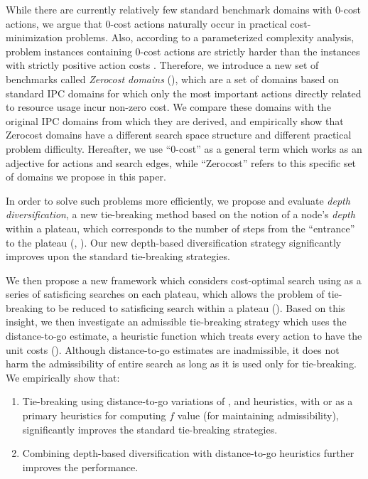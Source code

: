 While there are currently relatively few standard benchmark domains with 0-cost actions,
we argue that 0-cost actions naturally occur in
practical cost-minimization problems.
Also, according to a parameterized complexity analysis, problem instances containing 0-cost actions are strictly harder than the instances with strictly positive action costs \cite{aghighi2015}.
Therefore, we introduce a new set of benchmarks called \emph{Zerocost domains}
(), which are a set of domains based on standard IPC domains for which only the most important actions directly related to resource usage incur non-zero cost.
We compare these domains with the original IPC domains from which they are derived, and empirically show that 
Zerocost domains have a different search space structure and different practical problem difficulty.
Hereafter, we use ``0-cost'' as a general term which works as an adjective for actions and search edges, while ``Zerocost'' refers to this specific set of domains we propose in this paper.

In order to solve such problems more efficiently, we propose and
evaluate \emph{depth diversification}, a new
tie-breaking method based on the notion of a node's \emph{depth} within a plateau,
which corresponds to the number of steps from the ``entrance'' to
the plateau (,
). 
Our new depth-based diversification strategy significantly improves upon the 
standard tie-breaking strategies.

We then propose a new framework which considers cost-optimal search using \astar 
as a series of satisficing searches on each plateau,
which allows the problem of tie-breaking to be reduced to satisficing search within a plateau ().
Based on this insight, we then investigate an
admissible tie-breaking strategy which uses the distance-to-go estimate, a heuristic function which treats every action
to have the unit costs ().
Although distance-to-go estimates are inadmissible,
it does not harm the admissibility of entire search as long as it is used only for tie-breaking.
% 
We empirically show that:
\begin{enumerate}
 \item Tie-breaking using distance-to-go variations of \lmcut, \mands and \ff heuristics,
       with \lmcut or \mands as a primary heuristics for computing $f$ value (for maintaining admissibility),
       significantly improves the standard tie-breaking strategies.
 \item Combining depth-based diversification with distance-to-go heuristics 
       further improves the performance.
\end{enumerate}

